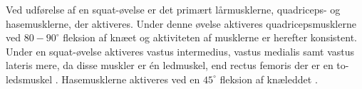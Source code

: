 Ved udførelse af en squat-øvelse er det primært lårmusklerne, quadriceps- og hasemusklerne, der aktiveres. Under denne øvelse aktiveres quadricepsmusklerne ved $80-90^{\circ}$ fleksion af knæet og aktiviteten af musklerne er herefter konsistent. Under en squat-øvelse aktiveres vastus intermedius, vastus medialis samt vastus lateris mere, da disse muskler er én ledmuskel, end rectus femoris der er en to-ledsmuskel . Hasemusklerne aktiveres ved en $45^{\circ}$ fleksion af knæleddet \citep{schoenfeld2010}. 



